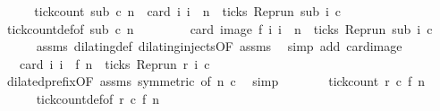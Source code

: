 \begin{isabellebody}
%
\isatagproof
{}\isamarkupfalse%
\ {\isacharminus}\isanewline
\ \ \isamarkupfalse%
\ {\isacartoucheopen}tick{\isacharunderscore}count\ sub\ c\ n\ {\isacharequal}\ card\ {\isacharbraceleft}i{\isachardot}\ i\ {\isasymle}\ n\ {\isasymand}\ ticks\ {\isacharparenleft}{\isacharparenleft}Rep{\isacharunderscore}run\ sub{\isacharparenright}\ i\ c{\isacharparenright}{\isacharbraceright}{\isacartoucheclose}\isanewline
\ \ \ \ \isamarkupfalse%
\ tick{\isacharunderscore}count{\isacharunderscore}def{\isacharbrackleft}of\ {\isacartoucheopen}sub{\isacartoucheclose}\ {\isacartoucheopen}c{\isacartoucheclose}\ {\isacartoucheopen}n{\isacartoucheclose}{\isacharbrackright}\ \isacommand{{\isachardot}}\isamarkupfalse%
\isanewline
\ \ \isamarkupfalse%
\ \isamarkupfalse%
\ {\isacartoucheopen}{\isachardot}{\isachardot}{\isachardot}\ {\isacharequal}\ card\ {\isacharparenleft}image\ f\ {\isacharbraceleft}i{\isachardot}\ i\ {\isasymle}\ n\ {\isasymand}\ ticks\ {\isacharparenleft}{\isacharparenleft}Rep{\isacharunderscore}run\ sub{\isacharparenright}\ i\ c{\isacharparenright}{\isacharbraceright}{\isacharparenright}{\isacartoucheclose}\isanewline
\ \ \ \ \isamarkupfalse%
\ assms\ dilating{\isacharunderscore}def\ dilating{\isacharunderscore}injects{\isacharbrackleft}OF\ assms{\isacharbrackright}\ \isamarkupfalse%
\ {\isacharparenleft}simp\ add{\isacharcolon}\ card{\isacharunderscore}image{\isacharparenright}\isanewline
\ \ \isamarkupfalse%
\ \isamarkupfalse%
\ {\isacartoucheopen}{\isachardot}{\isachardot}{\isachardot}\ {\isacharequal}\ card\ {\isacharbraceleft}i{\isachardot}\ i\ {\isasymle}\ f\ n\ {\isasymand}\ ticks\ {\isacharparenleft}{\isacharparenleft}Rep{\isacharunderscore}run\ r{\isacharparenright}\ i\ c{\isacharparenright}{\isacharbraceright}{\isacartoucheclose}\isanewline
\ \ \ \ \isamarkupfalse%
\ dilated{\isacharunderscore}prefix{\isacharbrackleft}OF\ assms{\isacharcomma}\ symmetric{\isacharcomma}\ of\ {\isacartoucheopen}n{\isacartoucheclose}\ {\isacartoucheopen}c{\isacartoucheclose}{\isacharbrackright}\ \isamarkupfalse%
\ simp\isanewline
\ \ \isamarkupfalse%
\ \isamarkupfalse%
\ {\isacartoucheopen}{\isachardot}{\isachardot}{\isachardot}\ {\isacharequal}\ tick{\isacharunderscore}count\ r\ c\ {\isacharparenleft}f\ n{\isacharparenright}{\isacartoucheclose}\isanewline
\ \ \ \ \isamarkupfalse%
\ tick{\isacharunderscore}count{\isacharunderscore}def{\isacharbrackleft}of\ {\isacartoucheopen}r{\isacartoucheclose}\ {\isacartoucheopen}c{\isacartoucheclose}\ {\isacartoucheopen}f\ n{\isacartoucheclose}{\isacharbrackright}\ \isamarkupfalse%

\end{isabellebody}
